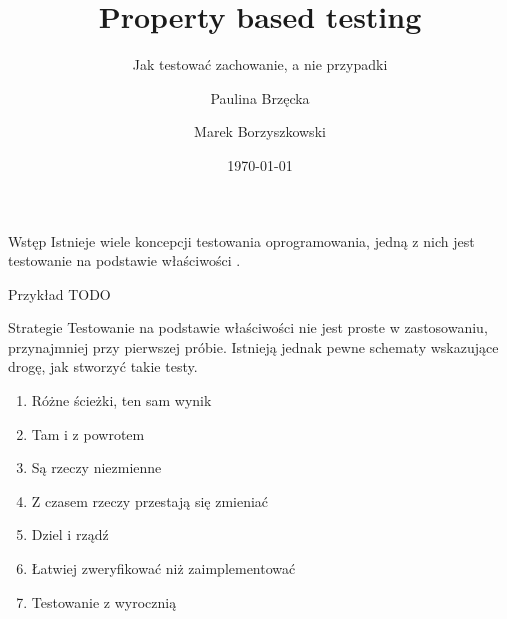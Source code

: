 \documentclass[polish,aspectratio=169]{beamer}
\title[Property based testing]{Property based testing}
\subtitle{Jak testować zachowanie, a nie przypadki}
\author{Paulina Brzęcka \and Marek Borzyszkowski}
\date{\today}
\begin{document}
\pgtitleframe



\begin{frame}{Wstęp}
    Istnieje wiele koncepcji testowania oprogramowania, jedną z nich jest testowanie na podstawie właściwości \cite{pbt_bib}.
\end{frame}

\begin{frame}{Przykład}
    TODO
\end{frame}

\begin{frame}{Strategie}
    Testowanie na podstawie właściwości nie jest proste w zastosowaniu, przynajmniej przy pierwszej próbie.
    Istnieją jednak pewne schematy wskazujące drogę, jak stworzyć takie testy.
    \begin{enumerate}[<+->]
        \item Różne ścieżki, ten sam wynik
        \item Tam i z powrotem
        \item Są rzeczy niezmienne
        \item Z czasem rzeczy przestają się zmieniać
        \item Dziel i rządź
        \item Łatwiej zweryfikować niż zaimplementować
        \item Testowanie z wyrocznią
    \end{enumerate}
\end{frame}
\end{document}
